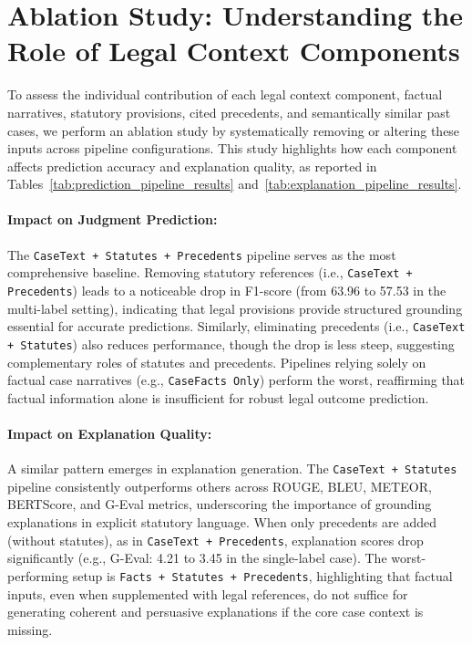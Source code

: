\section{Ablation Study: Understanding the Role of Legal Context Components}
\label{sec:ablation_study}

To assess the individual contribution of each legal context component, factual narratives, statutory provisions, cited precedents, and semantically similar past cases, we perform an ablation study by systematically removing or altering these inputs across pipeline configurations. This study highlights how each component affects prediction accuracy and explanation quality, as reported in Tables~\ref{tab:prediction_pipeline_results} and~\ref{tab:explanation_pipeline_results}.

\paragraph{Impact on Judgment Prediction:}
The \texttt{CaseText + Statutes + Precedents} pipeline serves as the most comprehensive baseline. Removing statutory references (i.e., \texttt{CaseText + Precedents}) leads to a noticeable drop in F1-score (from 63.96 to 57.53 in the multi-label setting), indicating that legal provisions provide structured grounding essential for accurate predictions. Similarly, eliminating precedents (i.e., \texttt{CaseText + Statutes}) also reduces performance, though the drop is less steep, suggesting complementary roles of statutes and precedents. Pipelines relying solely on factual case narratives (e.g., \texttt{CaseFacts Only}) perform the worst, reaffirming that factual information alone is insufficient for robust legal outcome prediction.

\paragraph{Impact on Explanation Quality:}
A similar pattern emerges in explanation generation. The \texttt{CaseText + Statutes} pipeline consistently outperforms others across ROUGE, BLEU, METEOR, BERTScore, and G-Eval metrics, underscoring the importance of grounding explanations in explicit statutory language. When only precedents are added (without statutes), as in \texttt{CaseText + Precedents}, explanation scores drop significantly (e.g., G-Eval: 4.21 to 3.45 in the single-label case). The worst-performing setup is \texttt{Facts + Statutes + Precedents}, highlighting that factual inputs, even when supplemented with legal references, do not suffice for generating coherent and persuasive explanations if the core case context is missing.

